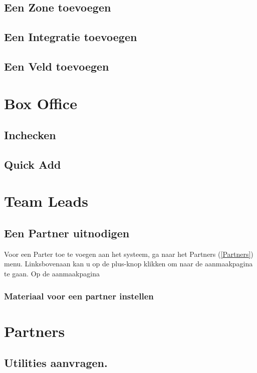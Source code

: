 \documentclass[]{memoir}
\begin{document}
\subsection{Een Zone toevoegen} \label{SetZone}
\subsection{Een Integratie toevoegen} \label{SetIntegration}
\subsection{Een Veld toevoegen} \label{SetField}

\section{Box Office} \label{BoxOfficeInstr}
\subsection{Inchecken} \label{BOCheckIn}
\subsection{Quick Add} \label{BOQuickAdd}

\section{Team Leads} \label{TeamLeadInstr}
\subsection{Een Partner uitnodigen} \label{AddPartner}
Voor een Parter toe te voegen aan het systeem, ga naar het Partners (\ref{Partners}) menu. Linksbovenaan kan u op de plus-knop klikken om naar de aanmaakpagina te gaan.
Op de aanmaakpagina
\subsubsection{Materiaal voor een partner instellen} \label{AddPartnerMaterial}

\section{Partners} \label{PartnerInstr}
\subsection{Utilities aanvragen.} \label{RequestMaterial}
\end{document}
